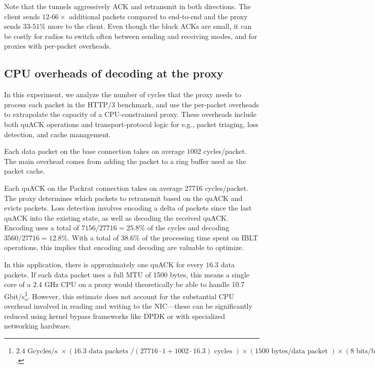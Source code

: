 \noindent Note that the tunnels aggressively ACK and retransmit in both
directions. The client sends $12$-$66\!\times$ additional packets compared to
end-to-end and the proxy sends $33$-$51$\% more to the client. Even though the
block ACKs are small, it can be costly for radios to switch often between
sending and receiving modes, and for proxies with per-packet overheads.

\subsection{CPU overheads of decoding at the proxy}
\label{sec:packrat:evaluation:cpu-overheads}

In this experiment, we analyze the number of cycles that the proxy
needs to process each
packet in the HTTP/3 benchmark, and use the per-packet overheads to
extrapolate the capacity of a CPU-constrained proxy. These overheads
include both quACK operations and transport-protocol logic for e.g.,
packet triaging, loss detection, and cache management.

Each data packet on the base connection takes on average $1002$ cycles/packet.
The main overhead comes from adding the packet to a ring buffer used as the
packet cache.

Each quACK on the Packrat connection takes on average 27716 cycles/packet. The
proxy determines which packets to retransmit based on the quACK and evicts
packets. Loss detection involves encoding a delta of packets since the last
quACK into the existing state, as well as decoding the received quACK. Encoding
uses a total of $7156/27716 = 25.8\%$ of the cycles and decoding $3560/27716 =
12.8\%$. With a total of $38.6\%$ of the processing time spent on IBLT
operations, this implies that encoding and decoding are valuable to optimize.



In this application, there is approximately one quACK for every $16.3$ data
packets. If each data packet uses a full MTU of 1500 bytes, this means a single
core of a 2.4 GHz CPU on a proxy would theoretically be able to handle 10.7
Gbit/s\footnote{ $2.4\text{ Gcycles/s }
\times(16.3 \text{ data packets } / (27716\cdot1 + 1002\cdot16.3) \text{ cycles })
\times (1500 \text{ bytes/data packet })
\times (8 \text{ bits/byte })
= 10.7 \text{ Gbit/s}$.
}. However, this estimate does not account for the substantial CPU overhead
involved in reading and writing to the NIC---these can be significantly reduced
using kernel bypass frameworks like DPDK or with specialized networking
hardware.

